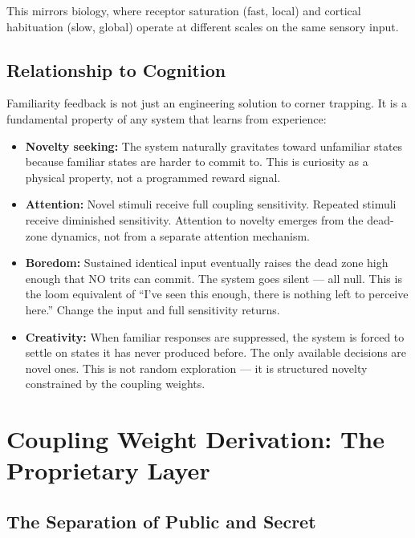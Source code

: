 \documentclass[11pt,a4paper]{article}
\begin{document}
This mirrors biology, where receptor saturation (fast, local) and cortical habituation (slow, global) operate at different scales on the same sensory input.

\subsection{Relationship to Cognition}

Familiarity feedback is not just an engineering solution to corner trapping. It is a fundamental property of any system that learns from experience:

\begin{itemize}
    \item \textbf{Novelty seeking:} The system naturally gravitates toward unfamiliar states because familiar states are harder to commit to. This is curiosity as a physical property, not a programmed reward signal.
    \item \textbf{Attention:} Novel stimuli receive full coupling sensitivity. Repeated stimuli receive diminished sensitivity. Attention to novelty emerges from the dead-zone dynamics, not from a separate attention mechanism.
    \item \textbf{Boredom:} Sustained identical input eventually raises the dead zone high enough that NO trits can commit. The system goes silent --- all null. This is the loom equivalent of ``I've seen this enough, there is nothing left to perceive here.'' Change the input and full sensitivity returns.
    \item \textbf{Creativity:} When familiar responses are suppressed, the system is forced to settle on states it has never produced before. The only available decisions are novel ones. This is not random exploration --- it is structured novelty constrained by the coupling weights.
\end{itemize}

\section{Coupling Weight Derivation: The Proprietary Layer}

\subsection{The Separation of Public and Secret}
\end{document}
